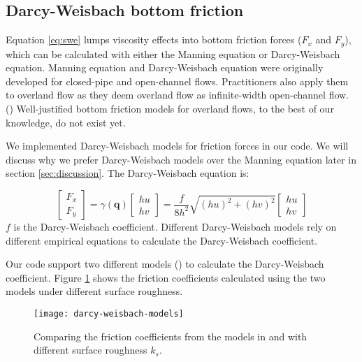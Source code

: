
\subsection{Darcy-Weisbach bottom friction}

Equation \ref{eq:swe} lumps viscosity effects into bottom friction forces ($F_x$ and $F_y$), which can be calculated with either the Manning equation or Darcy-Weisbach equation.
Manning equation and Darcy-Weisbach equation were originally developed for closed-pipe and open-channel flows. 
Practitioners also apply them to overland flow as they deem overland flow as infinite-width open-channel flow. (\cite{bellos_friction_2018})
Well-justified bottom friction models for overland flows, to the best of our knowledge, do not exist yet.

We implemented Darcy-Weisbach models for friction forces in our code. We will discuss why we prefer Darcy-Weisbach models over the Manning equation later in section \ref{sec:discussion}. The Darcy-Weisbach equation is:

\begin{equation}
    \begin{bmatrix} F_x \\ F_y \end{bmatrix}
    =
    \gamma(\boldsymbol{q})\begin{bmatrix} hu \\ hv \end{bmatrix}
    =
    \frac{f}{8h^2}\sqrt{(hu)^2+(hv)^2}\begin{bmatrix} hu \\ hv \end{bmatrix}
\end{equation}
$f$ is the Darcy-Weisbach coefficient.
Different Darcy-Weisbach models rely on different empirical equations to calculate the Darcy-Weisbach coefficient.

Our code support two different models (\cite{cheng_formulas_2008, bellos_friction_2018}) to calculate the Darcy-Weisbach coefficient. Figure \ref{fig:darcy-weisbach-models} shows the friction coefficients calculated using the two models under different surface roughness.

\begin{figure}
    \centering
    \texttt{[image: darcy-weisbach-models]}
    \caption{%
        Comparing the friction coefficients from the models in \cite{cheng_formulas_2008} and \cite{bellos_friction_2018} with different surface roughness $k_s$.
    }\label{fig:darcy-weisbach-models}
\end{figure}

